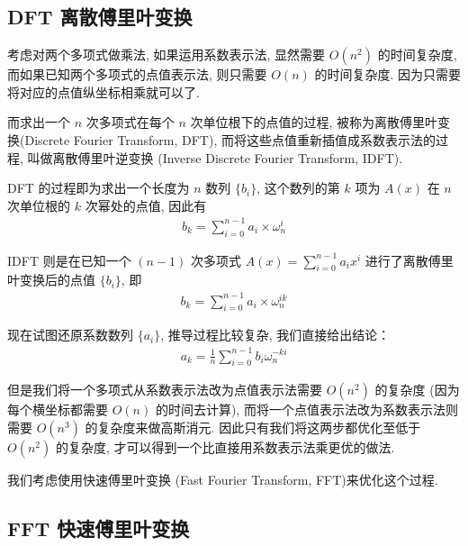 \documentclass[UTF8, a4paper, 11pt]{ctexart}
\theoremstyle{definition}
\begin{document}
\subsection{DFT 离散傅里叶变换}

考虑对两个多项式做乘法, 如果运用系数表示法, 显然需要 $O(n^2)$ 的时间复杂度, 而如果已知两个多项式的点值表示法, 则只需要 $O(n)$ 的时间复杂度. 因为只需要将对应的点值纵坐标相乘就可以了.


而求出一个 $n$ 次多项式在每个 $n$ 次单位根下的点值的过程, 被称为离散傅里叶变换(Discrete Fourier Transform, DFT), 而将这些点值重新插值成系数表示法的过程, 叫做离散傅里叶逆变换 (Inverse Discrete Fourier Transform, IDFT).

DFT 的过程即为求出一个长度为 $n$ 数列 $\{b_i\}$, 这个数列的第 $k$ 项为 $A(x)$ 在 $n$ 次单位根的 $k$ 次幂处的点值, 因此有
\begin{align*}
    b_k=\sum_{i = 0}^{n - 1} a_i \times \omega_{n}^i
\end{align*}

IDFT 则是在已知一个 $(n - 1)$ 次多项式 $A(x)=\sum_{i = 0}^{n - 1} a_i x^i$ 进行了离散傅里叶变换后的点值 $\{b_i\}$, 即
\begin{align*}
    b_k=\sum_{i = 0}^{n - 1} a_i \times \omega_n^{ik}
\end{align*}

现在试图还原系数数列 $\{a_i\}$, 推导过程比较复杂, 我们直接给出结论：
\begin{align*}
    a_k=\frac{1}{n} \sum_{i = 0}^{n - 1} b_i \omega_n^{-ki}
\end{align*}

但是我们将一个多项式从系数表示法改为点值表示法需要 $O(n^2)$ 的复杂度 (因为每个横坐标都需要 $O(n)$ 的时间去计算), 而将一个点值表示法改为系数表示法则需要 $O(n^3)$ 的复杂度来做高斯消元. 因此只有我们将这两步都优化至低于 $O(n^2)$ 的复杂度, 才可以得到一个比直接用系数表示法乘更优的做法.

我们考虑使用快速傅里叶变换 (Fast Fourier Transform, FFT)来优化这个过程.

\subsection{FFT 快速傅里叶变换}
\end{document}
